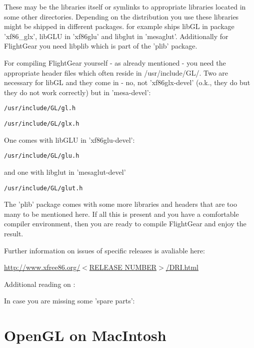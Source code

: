 These may be the libraries itself or symlinks to appropriate libraries
located in some other directories. Depending on the distribution you use
these libraries might be shipped in different packages.  for example
ships libGL in package 'xf86\_glx', libGLU in 'xf86glu' and libglut in
'mesaglut'. Additionally for FlightGear you need libplib which is part of
the 'plib' package.

For compiling FlightGear yourself - as already mentioned - you need the
appropriate header files which often reside in /usr/include/GL/. Two are
necessary for libGL and they come in - no, not 'xf86glx-devel' (o.k., they
do but they do not work correctly) but in 'mesa-devel':
\medskip

\texttt{/usr/include/GL/gl.h}

\texttt{/usr/include/GL/glx.h}
\medskip

\noindent
One comes with libGLU in 'xf86glu-devel':
\medskip

\texttt{/usr/include/GL/glu.h}
\medskip

and one with libglut in 'mesaglut-devel'
\medskip

\texttt{/usr/include/GL/glut.h}
\medskip

The 'plib' package comes with some more libraries and headers that are too
many to be mentioned here. If all this is present and you have a comfortable
compiler environment, then you are ready to compile FlightGear and enjoy the
result.


Further information on  issues of specific  releases is
avaliable here:
\medskip

\underline{http://www.xfree86.org/{$<$}RELEASE NUMBER{$>$}/DRI.html}

\medskip

\noindent
Additional reading on :
\medskip

\medskip

\noindent
In case you are missing some 'spare parts':
\medskip



\section{OpenGL on MacIntosh}

